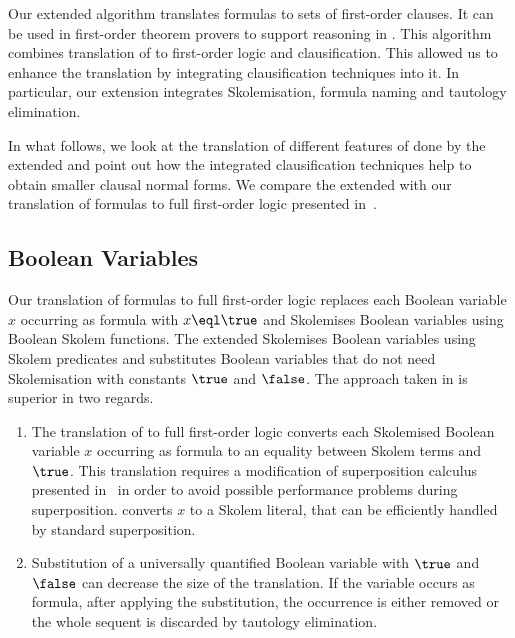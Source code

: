 
Our extended \newcnf{} algorithm translates \folb{} formulas to sets of first-order clauses. It can be used in first-order theorem provers to support reasoning in \folb{}. This algorithm combines translation of \folb{} to first-order logic and clausification. This allowed us to enhance the translation by integrating clausification techniques into it. In particular, our extension integrates Skolemisation, formula naming and tautology elimination. 

In what follows, we look at the translation of different features of \folb{} done by the extended \newcnf{} and point out how the integrated clausification techniques help to obtain smaller clausal normal forms. We compare the extended \newcnf{} with our translation of \folb{} formulas to full first-order logic presented in~\cite{FOOL}.

\subsection{Boolean Variables}
Our translation of \folb{} formulas to full first-order logic replaces each Boolean variable $x$ occurring as formula with $x \eql \true$ and Skolemises Boolean variables using Boolean Skolem functions. The extended \newcnf{} Skolemises Boolean variables using Skolem predicates and substitutes Boolean variables that do not need Skolemisation with constants $\true$ and $\false$. The approach taken in \newcnf{} is superior in two regards.
\begin{enumerate}
  \item The translation of \folb{} to full first-order logic converts each Skolemised Boolean variable $x$ occurring as formula to an equality between Skolem terms and $\true$. This translation requires a modification of superposition calculus presented in~\cite{FOOL} in order to avoid possible performance problems during superposition. \newcnf{} converts $x$ to a Skolem literal, that can be efficiently handled by standard superposition.  
  \item Substitution of a universally quantified Boolean variable with $\true$ and $\false$ can decrease the size of the translation. If the variable occurs as formula, after applying the substitution, the occurrence is either removed or the whole sequent is discarded by tautology elimination.
\end{enumerate}

